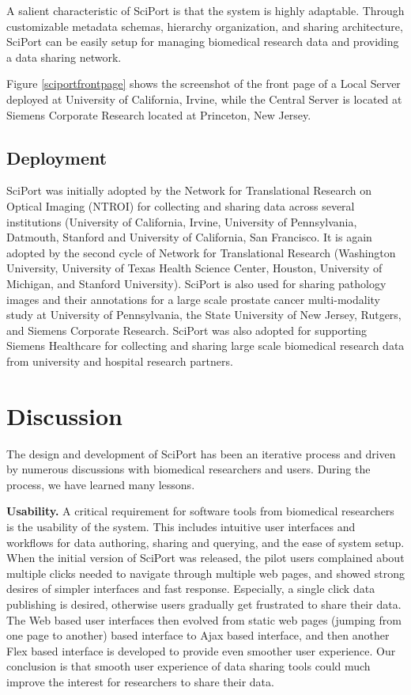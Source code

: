 \documentclass{doublecol-new}
\theoremstyle{TH}{
\newtheorem{lemma}{Lemma}
\newtheorem{theorem}[lemma]{Theorem}
\newtheorem{corrolary}[lemma]{Corrolary}
\newtheorem{conjecture}[lemma]{Conjecture}
\newtheorem{proposition}[lemma]{Proposition}
\newtheorem{claim}[lemma]{Claim}
\newtheorem{stheorem}[lemma]{Wrong Theorem}
\newtheorem{algorithm}{Algorithm}
}
\theoremstyle{THrm}{
\newtheorem{definition}{Definition}[section]
\newtheorem{question}{Question}[section]
\newtheorem{remark}{Remark}
\newtheorem{scheme}{Scheme}
}
\theoremstyle{THhit}{
\newtheorem{case}{Case}[section]
}
\begin{document}
A salient characteristic of SciPort is that the system is highly
adaptable. Through customizable metadata schemas, hierarchy
organization, and sharing architecture, SciPort can be easily setup
for managing biomedical research data and providing a data sharing
network.

Figure \ref{sciportfrontpage} shows the screenshot of the front page
of a Local Server deployed at University of California, Irvine,
while the Central Server is located at Siemens Corporate Research
located at Princeton, New Jersey.

\subsection{Deployment}

SciPort was initially adopted by the Network for Translational
Research on Optical Imaging (NTROI) for collecting and sharing data
across several institutions (University of California, Irvine,
University of Pennsylvania, Datmouth, Stanford and University of
California, San Francisco. It is again adopted by the second cycle
of Network for Translational Research (Washington University,
University of Texas Health Science Center, Houston, University of
Michigan, and Stanford University).  SciPort is also used for
sharing pathology images and their annotations for a large scale
prostate cancer multi-modality study at University of Pennsylvania,
the State University of New Jersey, Rutgers, and Siemens Corporate
Research.  SciPort was also adopted for supporting Siemens
Healthcare for collecting and sharing large scale biomedical
research data from university and hospital research partners.

\section{Discussion}

The design and development of SciPort has been an iterative process
and driven by numerous discussions with biomedical researchers and
users. During the process, we have learned many lessons.


\textbf{Usability.}  A critical requirement for software tools from
biomedical researchers is the usability of the system. This includes
intuitive user interfaces and workflows for data authoring, sharing
and querying, and the ease of system setup. When the initial version
of SciPort was released, the pilot users complained about multiple
clicks needed to navigate through multiple web pages, and showed
strong desires of simpler interfaces and fast response. Especially,
a single click data publishing is desired, otherwise users gradually
get frustrated to share their data.   The Web based user interfaces
then evolved from static web pages (jumping from one page to
another) based interface to Ajax based interface, and then another
Flex based interface is developed to provide even smoother user
experience. Our conclusion is that smooth user experience of data
sharing tools could much improve the interest for researchers to
share their data.
\end{document}
